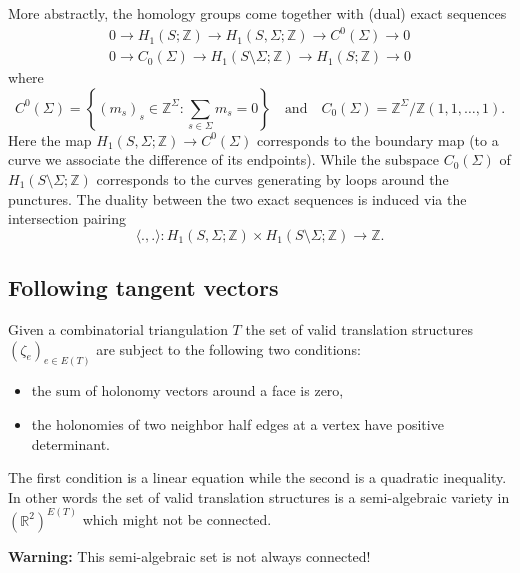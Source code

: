 \documentclass[a4paper,12pt]{article}
\def\bR{\mathbb{R}}
\def\bZ{\mathbb{Z}}
\begin{document}
More abstractly, the homology groups come together with (dual) exact sequences
\begin{align}
0 \to H_1(S; \bZ) \to H_1(S, \Sigma; \bZ) \to C^0(\Sigma) \to 0 \\
0 \to C_0(\Sigma) \to H_1(S \setminus \Sigma; \bZ) \to H_1(S; \bZ) \to 0
\end{align}
where
\[
C^0(\Sigma) = \left\{(m_s)_s \in \bZ^\Sigma: \sum_{s\in\Sigma} m_s = 0 \right\}
\quad \text{and} \quad
C_0(\Sigma) = \bZ^\Sigma / \bZ (1,1,\ldots,1).
\]
Here the map $H_1(S, \Sigma; \bZ) \to C^0(\Sigma)$ corresponds to the boundary map
(to a curve we associate the difference of its endpoints). While the subspace $C_0(\Sigma)$
of $H_1(S \setminus \Sigma; \bZ)$ corresponds to the curves generating by loops around the
punctures. The duality between the two exact sequences is induced via the intersection pairing
\[
\langle .,. \rangle: H_1(S, \Sigma; \bZ) \times H_1(S \setminus \Sigma; \bZ) \to \bZ.
\]

\subsection{Following tangent vectors}
Given a combinatorial triangulation $T$ the set of valid translation structures $(\zeta_e)_{e \in E(T)}$
are subject to the following two conditions:
\begin{itemize}
\item the sum of holonomy vectors around a face is zero,
\item the holonomies of two neighbor half edges at a vertex have positive determinant.
\end{itemize}
The first condition is a linear equation while the second is a quadratic inequality.
In other words the set of valid translation structures is a semi-algebraic variety
in $(\bR^2)^{E(T)}$ which might not be connected.

\textbf{Warning:} This semi-algebraic set is not always connected!
\end{document}
